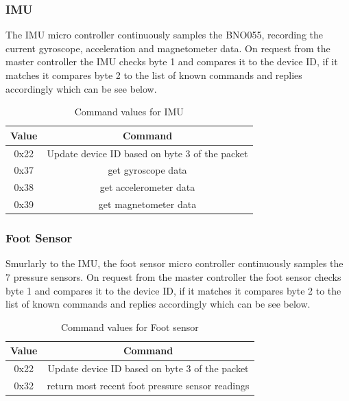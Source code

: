     \subsubsection{IMU}
    The IMU micro controller continuously samples the BNO055, recording the current gyroscope, acceleration and magnetometer data. On request from the master controller the IMU checks byte 1 and compares it to the device ID, if it matches it compares byte 2 to the list of known commands and replies accordingly which can be see below.
    \begin{table}[H]
            \centering
            \begin{tabular}{|c|c|}
            \hline
                Value & Command \\
                \hline
                0x22 & Update device ID based on byte 3 of the packet\\
                0x37 & get gyroscope data\\
                0x38 & get accelerometer data\\
                0x39 & get magnetometer data\\
                \hline
                \end{tabular}
            \caption{Command values for IMU}
            \label{tab:IMUCommandValues}
        \end{table}

    \subsubsection{Foot Sensor}
    Smurlarly to the IMU, the foot sensor micro controller continuously samples the 7 pressure sensors. On request from the master controller the foot sensor checks byte 1 and compares it to the device ID, if it matches it compares byte 2 to the list of known commands and replies accordingly which can be see below.
    \begin{table}[H]
            \centering
            \begin{tabular}{|c|c|}
            \hline
                Value & Command \\
                \hline
                0x22 & Update device ID based on byte 3 of the packet\\
                0x32 & return most recent foot pressure sensor readings\\
                \hline
                \end{tabular}
            \caption{Command values for Foot sensor}
            \label{tab:FootSensorCommandValues}
        \end{table}

